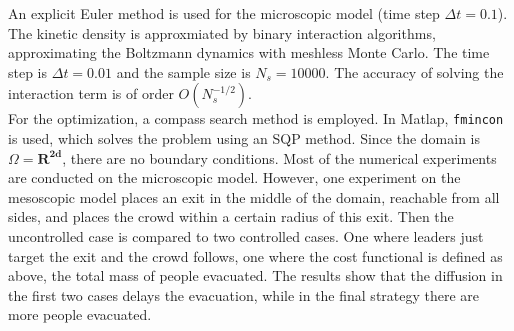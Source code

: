 \documentclass[11pt, a4paper]{article}
\theoremstyle{definition}
\begin{document}
An explicit Euler method is used for the microscopic model (time step $\Delta t =0.1$).
The kinetic density is approxmiated by binary interaction algorithms, approximating the Boltzmann dynamics with meshless Monte Carlo. The time step is $\Delta t=0.01$ and the sample size is $N_s=10000$.
The accuracy of solving the interaction term is of order $ O(N_s^{-1/2})$.\\
For the optimization, a compass search method is employed. In Matlap, \texttt{fmincon} is used, which solves the problem using an SQP method.
Since the domain is $\Omega = \mathbf{R^{2d}}$, there are no boundary conditions. Most of the numerical experiments are conducted on the microscopic model. However, one experiment on the mesoscopic model places an exit in the middle of the domain, reachable from all sides, and places the crowd within a certain radius of this exit. Then the uncontrolled case is compared to two controlled cases. One where leaders just target the exit and the crowd follows, one where the cost functional is defined as above, the total mass of people evacuated. The results show that the diffusion in the first two cases delays the evacuation, while in the final strategy there are more people evacuated.
\end{document}
